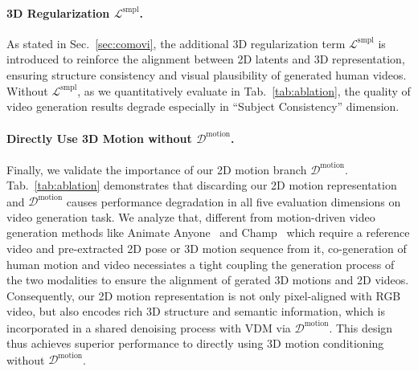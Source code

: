 \vspace{-2mm}
\paragraph{3D Regularization $\mathcal{L}^{\text{smpl}}$.} As stated in Sec.~\ref{sec:comovi}, the additional 3D regularization term $\mathcal{L}^{\text{smpl}}$ is introduced to reinforce the alignment between 2D latents and 3D representation, ensuring structure consistency and visual plausibility of generated human videos. Without $\mathcal{L}^{\text{smpl}}$, as we quantitatively evaluate in Tab.~\ref{tab:ablation}, the quality of video generation results degrade especially in ``Subject Consistency'' dimension.

\vspace{-2mm}
\paragraph{Directly Use 3D Motion without $\mathcal{D}^{\text{motion}}$.} Finally, we validate the importance of our 2D motion branch $\mathcal{D}^{\text{motion}}$. Tab.~\ref{tab:ablation} demonstrates that discarding our 2D motion representation and $\mathcal{D}^{\text{motion}}$ causes performance degradation in all five evaluation dimensions on video generation task. We analyze that, different from motion-driven video generation methods like Animate Anyone~\cite{hu2024animate} and Champ~\cite{zhu2024champ} which require a reference video and pre-extracted 2D pose or 3D motion sequence from it, co-generation of human motion and video necessiates a tight coupling the generation process of the two modalities to ensure the alignment of gerated 3D motions and 2D videos. Consequently, our 2D motion representation is not only pixel-aligned with RGB video, but also encodes rich 3D structure and semantic information, which is incorporated in a shared denoising process with VDM via $\mathcal{D}^{\text{motion}}$. This design thus achieves superior performance to directly using 3D motion conditioning without $\mathcal{D}^{\text{motion}}$.